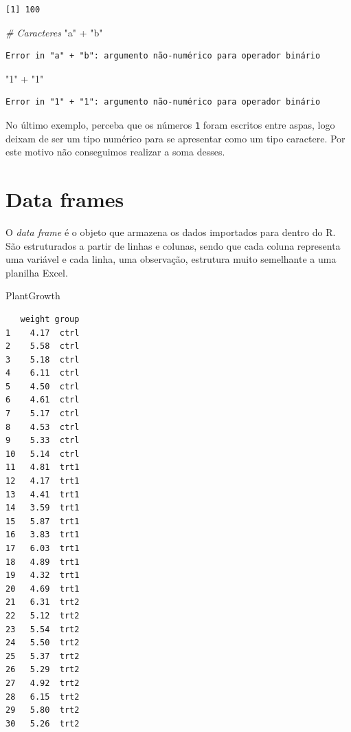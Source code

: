 \documentclass[
  brazilian,
]{book}
\newenvironment{Shaded}{\begin{snugshade}}{\end{snugshade}}
\newcommand{\CommentTok}[1]{\textcolor[rgb]{0.56,0.35,0.01}{\textit{#1}}}
\newcommand{\NormalTok}[1]{#1}
\newcommand{\SpecialCharTok}[1]{\textcolor[rgb]{0.00,0.00,0.00}{#1}}
\newcommand{\StringTok}[1]{\textcolor[rgb]{0.31,0.60,0.02}{#1}}
\begin{document}
\begin{verbatim}
[1] 100
\end{verbatim}

\begin{Shaded}
\begin{Highlighting}[]
\CommentTok{\# Caracteres}
\StringTok{"a"} \SpecialCharTok{+} \StringTok{"b"}
\end{Highlighting}
\end{Shaded}

\begin{verbatim}
Error in "a" + "b": argumento não-numérico para operador binário
\end{verbatim}

\begin{Shaded}
\begin{Highlighting}[]
\StringTok{"1"} \SpecialCharTok{+} \StringTok{"1"}
\end{Highlighting}
\end{Shaded}

\begin{verbatim}
Error in "1" + "1": argumento não-numérico para operador binário
\end{verbatim}

No último exemplo, perceba que os números \texttt{1} foram escritos entre aspas, logo deixam de ser um tipo numérico para se apresentar como um tipo caractere. Por este motivo não conseguimos realizar a soma desses.

\hypertarget{dataf}{%
\section{Data frames}\label{dataf}}

O \emph{data frame} é o objeto que armazena os dados importados para dentro do R. São estruturados a partir de linhas e colunas, sendo que cada coluna representa uma variável e cada linha, uma observação, estrutura muito semelhante a uma planilha Excel.

\begin{Shaded}
\begin{Highlighting}[]
\NormalTok{PlantGrowth}
\end{Highlighting}
\end{Shaded}

\begin{verbatim}
   weight group
1    4.17  ctrl
2    5.58  ctrl
3    5.18  ctrl
4    6.11  ctrl
5    4.50  ctrl
6    4.61  ctrl
7    5.17  ctrl
8    4.53  ctrl
9    5.33  ctrl
10   5.14  ctrl
11   4.81  trt1
12   4.17  trt1
13   4.41  trt1
14   3.59  trt1
15   5.87  trt1
16   3.83  trt1
17   6.03  trt1
18   4.89  trt1
19   4.32  trt1
20   4.69  trt1
21   6.31  trt2
22   5.12  trt2
23   5.54  trt2
24   5.50  trt2
25   5.37  trt2
26   5.29  trt2
27   4.92  trt2
28   6.15  trt2
29   5.80  trt2
30   5.26  trt2
\end{verbatim}
\end{document}
